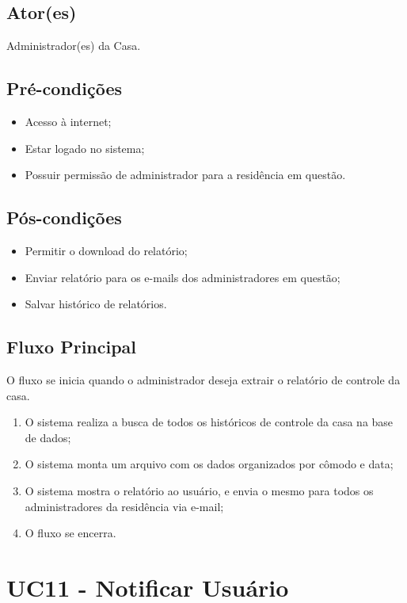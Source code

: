 \begin{anexosenv}
    \subsection{Ator(es)}
        Administrador(es) da Casa.
    \subsection{Pré-condições}
        \begin{itemize}
            \item Acesso à internet;
            \item Estar logado no sistema;
            \item Possuir permissão de administrador para a residência em questão.
        \end{itemize}
    \subsection{Pós-condições}
        \begin{itemize}
            \item Permitir o download do relatório;
            \item Enviar relatório para os e-mails dos administradores em questão;
            \item Salvar histórico de relatórios.
        \end{itemize}
    \subsection{Fluxo Principal}
        O fluxo se inicia quando o administrador deseja extrair o relatório de controle da casa.
        \begin{enumerate}
            \item O sistema realiza a busca de todos os históricos de controle da casa na base de dados;
            \item O sistema monta um arquivo com os dados organizados por cômodo e data;
            \item O sistema mostra o relatório ao usuário, e envia o mesmo para todos os administradores da residência via e-mail;
            \item O fluxo se encerra.
        \end{enumerate}

\section{UC11 \-- Notificar Usuário}

\end{anexosenv}
